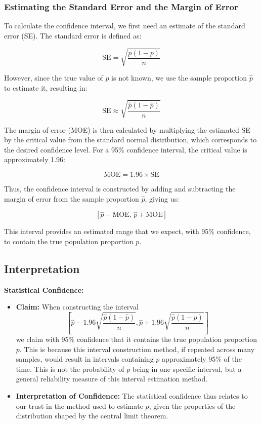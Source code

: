 \documentclass[11pt]{article}
\begin{document}
\subsubsection*{Estimating the Standard Error and the Margin of Error}

To calculate the confidence interval, we first need an estimate of the standard error (SE). The standard error is defined as:

\[
\text{SE} = \sqrt{\frac{p(1-p)}{n}}
\]

However, since the true value of \( p \) is not known, we use the sample proportion \( \hat{p} \) to estimate it, resulting in:

\[
\text{SE} \approx \sqrt{\frac{\hat{p}(1-\hat{p})}{n}}
\]

The margin of error (MOE) is then calculated by multiplying the estimated SE by the critical value from the standard normal distribution, which corresponds to the desired confidence level. For a 95\% confidence interval, the critical value is approximately 1.96:

\[
\text{MOE} = 1.96 \times \text{SE}
\]

Thus, the confidence interval is constructed by adding and subtracting the margin of error from the sample proportion \( \hat{p} \), giving us:

\[
\left[\hat{p} - \text{MOE}, \, \hat{p} + \text{MOE}\right]
\]

This interval provides an estimated range that we expect, with 95\% confidence, to contain the true population proportion \( p \).

\subsection*{Interpretation}

\textbf{Statistical Confidence:}
\begin{itemize}
  \item \textbf{Claim:} When constructing the interval 
  \[\left[\hat{p} - 1.96\sqrt{\frac{\hat{p}(1-\hat{p})}{n}}, \hat{p} + 1.96\sqrt{\frac{\hat{p}(1-\hat{p})}{n}}\right]\]
  we claim with 95\% confidence that it contains the true population proportion \( p \). This is because this interval construction method, if repeated across many samples, would result in intervals containing \( p \) approximately 95\% of the time. This is not the probability of \( p \) being in one specific interval, but a general reliability measure of this interval estimation method.
  \item \textbf{Interpretation of Confidence:} The statistical confidence thus relates to our trust in the method used to estimate \( p \), given the properties of the distribution shaped by the central limit theorem.
\end{itemize}
\end{document}
